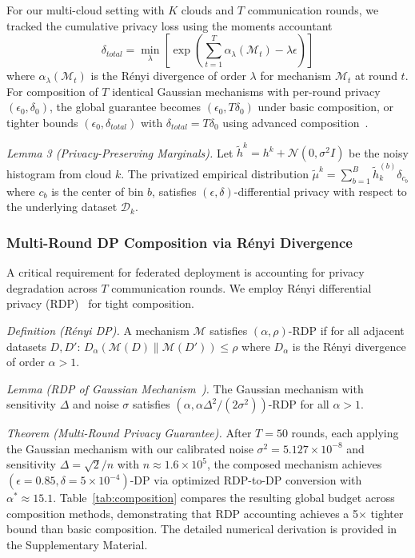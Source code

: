 \documentclass{ieeeaccess}
\newcommand{\M}{\mathcal{M}}
\theoremstyle{plain}
\theoremstyle{definition}
\theoremstyle{remark}
\begin{document}
For our multi-cloud setting with $K$ clouds and $T$ communication rounds, we tracked the cumulative privacy loss using the moments accountant~\cite{abadi2016}
\begin{equation}
\delta_{total} = \min_\lambda \left[ \exp \left( \sum_{t=1}^T \alpha_\lambda(\mathcal{M}_t) - \lambda\epsilon \right) \right]
\end{equation}
where $\alpha_\lambda(\mathcal{M}_t)$ is the R\'{e}nyi divergence of order $\lambda$ for mechanism $\mathcal{M}_t$ at round $t$. For composition of $T$ identical Gaussian mechanisms with per-round privacy $(\epsilon_0, \delta_0)$, the global guarantee becomes $(\epsilon_0, T\delta_0)$ under basic composition, or tighter bounds $(\epsilon_0, \delta_{total})$ with $\delta_{total} = T\delta_0$ using advanced composition~\cite{kairouz2021}.

\textit{Lemma 3 (Privacy-Preserving Marginals).} Let $\tilde{h}^k = h^k + \mathcal{N}(0, \sigma^2 I)$ be the noisy histogram from cloud $k$. The privatized empirical distribution $\tilde{\mu}^k = \sum_{b=1}^B \tilde{h}^{(b)}_k \delta_{c_b}$ where $c_b$ is the center of bin $b$, satisfies $(\epsilon, \delta)$-differential privacy with respect to the underlying dataset $\mathcal{D}_k$.

\subsubsection{Multi-Round DP Composition via R\'{e}nyi Divergence}
\label{sec:rdp_composition}

A critical requirement for federated deployment is accounting for privacy degradation across $T$ communication rounds. We employ R\'{e}nyi differential privacy (RDP)~\cite{mironov2017} for tight composition.

\textit{Definition (R\'{e}nyi DP).} A mechanism $\M$ satisfies $(\alpha, \rho)$-RDP if for all adjacent datasets $D, D'$: $D_\alpha(\M(D) \| \M(D')) \leq \rho$ where $D_\alpha$ is the R\'{e}nyi divergence of order $\alpha > 1$.

\textit{Lemma (RDP of Gaussian Mechanism~\cite{mironov2017}).} The Gaussian mechanism with sensitivity $\Delta$ and noise $\sigma$ satisfies $(\alpha, \alpha\Delta^2/(2\sigma^2))$-RDP for all $\alpha > 1$.

\textit{Theorem (Multi-Round Privacy Guarantee).} After $T = 50$ rounds, each applying the Gaussian mechanism with our calibrated noise $\sigma^2 = 5.127 \times 10^{-8}$ and sensitivity $\Delta = \sqrt{2}/n$ with $n \approx 1.6 \times 10^5$, the composed mechanism achieves $(\epsilon = 0.85, \delta = 5 \times 10^{-4})$-DP via optimized RDP-to-DP conversion with $\alpha^* \approx 15.1$. Table~\ref{tab:composition} compares the resulting global budget across composition methods, demonstrating that RDP accounting achieves a 5$\times$ tighter bound than basic composition. The detailed numerical derivation is provided in the Supplementary Material.
\end{document}
